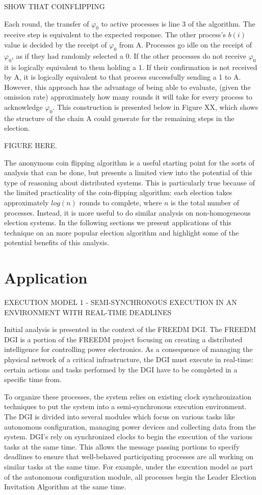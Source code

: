 \documentclass[12pt,oneside]{article}
\begin{document}
SHOW THAT COINFLIPPING 

Each round, the transfer of $\varphi_0$ to active processes is line 3 of the algorithm. The receive step is equivalent to the expected response. The other process's $b(i)$ value is decided by the receipt of $\varphi_0$ from A. Processes go idle on the receipt of $\varphi_0$, as if they had randomly selected a 0. If the other processes do not receive $\varphi_0$ it is logically equivalent to them holding a 1. If their confirmation is not received by A, it is logically equivalent to that process successfully sending a 1 to A. However, this approach has the advantage of being able to evaluate, (given the omission rate) approximately how many rounds it will take for every process to acknowledge $\varphi_0$. This construction is presented below in Figure XX, which shows the structure of the chain A could generate for the remaining steps in the election.

FIGURE HERE.

The anonymous coin flipping algorithm is a useful starting point for the sorts of analysis that can be done, but presents a limited view into the potential of this type of reasoning about distributed systems. This is particularly true because of the limited practicality of the coin-flipping algorithm: each election takes approximately $log(n)$ rounds to complete, where $n$ is the total number of processes. Instead, it is more useful to do similar analysis on non-homogeneous election systems. In the following sections we present applications of this technique on an more popular election algorithm and highlight some of the potential benefits of this analysis.

\section{Application}

EXECUTION MODEL 1 - SEMI-SYNCHRONOUS EXECUTION IN AN ENVIRONMENT WITH REAL-TIME DEADLINES


Initial analysis is presented in the context of the FREEDM DGI. The FREEDM DGI is a portion of the FREEDM project focusing on creating a distributed intelligence for controlling power electronics. As a consequence of managing the physical network of a critical infrastructure, the DGI must execute in real-time: certain actions and tasks performed by the DGI have to be completed in a specific time from.

To organize these processes, the system relies on existing clock synchronization techniques to put the system into a semi-synchronous execution environment. The DGI is divided into several modules which focus on various tasks like autonomous configuration, managing power devices and collecting data from the system. DGI's rely on synchronized clocks to begin the execution of the various tasks at the same time. This allows the message passing portions to specify deadlines to ensure that well-behaved participating processes are all working on similar tasks at the same time. For example, under the execution model as part of the autonomous configuration module, all processes begin the Leader Election Invitation Algorithm at the same time.
\end{document}
